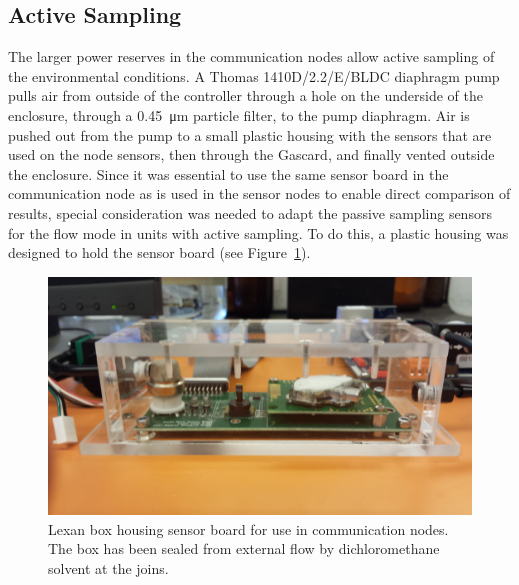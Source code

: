 \documentclass[numbook, envcountsect, envcountsame, envcountreset, runningheads, twocolumn]{svjour3}
\begin{document}
		\subsection{Active Sampling}
			\label{sec:activesampling}
			The larger power reserves in the communication nodes allow active sampling of the environmental conditions.  A Thomas 1410D/2.2/E/BLDC diaphragm pump pulls air from outside of the controller through a hole on the underside of the enclosure, through a \SI{0.45}{\micro\meter} particle filter, to the pump diaphragm.  Air is pushed out from the pump to a small plastic housing with the sensors that are used on the node sensors, then through the Gascard, and finally vented outside the enclosure.  Since it was essential to use the same sensor board in the communication node as is used in the sensor nodes to enable direct comparison of results, special consideration was needed to adapt the passive sampling sensors for the flow mode in units with active sampling.  To do this, a plastic housing was designed to hold the sensor board (see Figure~\ref{fig:lexbox}).  
			
			\begin{figure}[!t]
				\centering
				\includegraphics[width=.8\columnwidth,height=0.8\columnwidth,keepaspectratio]{lexbox.jpg}
				\caption[Lexan box housing]{Lexan box housing sensor board for use in communication nodes.  The box has been sealed from external flow by dichloromethane solvent at the joins.}
				\label{fig:lexbox}
		\end{figure}
		
\end{document}
